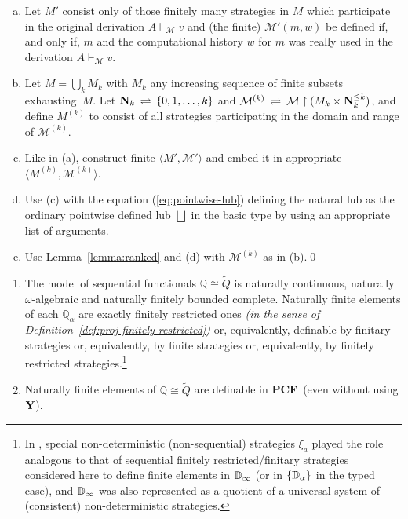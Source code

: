 \documentclass[fleqn]{LMCS}
\theoremstyle{plain}\newtheorem{satz}[thm]{Satz}
\theoremstyle{plain}\newtheorem{hyp}[thm]{Hypothesis}
\theoremstyle{plain}\newtheorem{hyps}[thm]{Hypotheses}
\theoremstyle{definition}\newtheorem{note}[thm]{Note}
\newcommand{\restr}{\upharpoonright}
\newcommand{\setof}[1]{\{#1\}}
\newcommand{\bYdef}{\mathrel{\BYDEF}}
\newcommand{\BYDEF}{\mbox{$\hspace{.2em}\rightleftharpoons\hspace{.2em}$}}
\newcommand{\la}{\langle}
\newcommand{\ra}{\rangle}
\newcommand{\tuple}[1]{\la #1 \ra}
\newcommand{\NN}{\mathbf{N}}
\newcommand{\bbQ}{\mathbb{Q}}
\newcommand{\PCF}{\mbox{\bf PCF}}
\newcommand{\Y}{\mbox{\bf Y}}
\newcommand{\MM}{{\mathcal M}}
\newcommand{\tQ}{\tilde{Q}}
\newcommand{\?}{\mbox{?}}
\begin{document}
\begin{enumerate}[(a)]
\item Let $M'$ consist only of those finitely many strategies in $M$ which 
participate in the original derivation $A\vdash_\MM v$ and 
(the finite) $\MM'(m,w)$ be defined if, and only if, $m$ and 
the computational history $w$ for $m$ 
was really used in the derivation $A\vdash_\MM v$. 

\item Let $M=\bigcup_k M_k$ with $M_k$ any increasing sequence of finite subsets exhausting~$M$. 
Let $\NN_k\bYdef\setof{0,1,\ldots,k}$ and 
$\MM^{(k)}\bYdef\MM\restr (M_k\times\NN_k^{\le k})$, and define $M^{(k)}$ 
to consist of all strategies 
participating in the domain and range of $\MM^{(k)}$. 

\item Like in (a), construct finite $\tuple{M',\MM'}$ and embed it in appropriate 
$\tuple{M^{(k)},\MM^{(k)}}$. 

\item Use (c) with the equation (\ref{eq:pointwise-lub}) 
defining the natural lub as the ordinary 
pointwise defined lub $\bigsqcup$ in the basic type 
by using an appropriate list of arguments. 

\item Use Lemma~\ref{lemma:ranked} and (d) with $\MM^{(k)}$ as in (b).\qed
\end{enumerate}

\begin{thm}\label{th:continuity}\hfill
\begin{enumerate}[\em(a)]
\item The model of sequential functionals $\bbQ\cong\tQ$ 
is naturally continuous, 
naturally $\omega$-algebraic and naturally finitely bounded complete. 
Naturally finite elements of each $\bbQ_\alpha$ are exactly 
finitely restricted ones\/ {\em(in the sense of Definition~\ref{def:proj-finitely-restricted})} 
or, equivalently, definable 
by finitary strategies or, equivalently, 
by finite strategies or, equivalently, 
by finitely restricted strategies.\footnote{In \cite{Saz76SMZH}, special non-deterministic (non-sequential) 
strategies $\xi_a$ played the role analogous to that of 
sequential finitely restricted/finitary strategies considered here 
to define finite elements in $\mathbb{D}_\infty$ (or in $\setof{\bbD_\alpha}$ in the 
typed case), and $\mathbb{D}_\infty$ was also represented as a quotient of a universal 
system of (consistent) non-deterministic strategies. 
}
\item Naturally finite elements of $\bbQ\cong\tQ$ are definable in 
\PCF\ (even without using $\Y$). 
\end{enumerate}
\end{thm}
\end{document}
